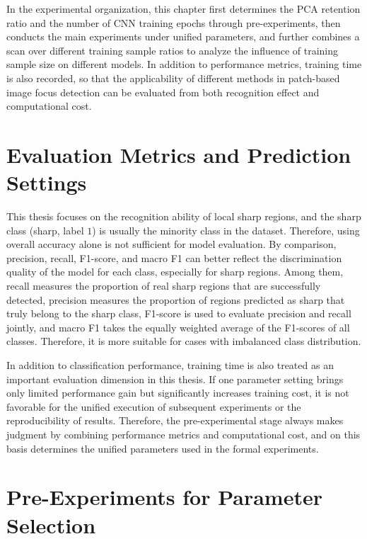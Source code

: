 \par In the experimental organization, this chapter first determines the PCA
retention ratio and the number of CNN training epochs through pre-experiments,
then conducts the main experiments under unified parameters, and further
combines a scan over different training sample ratios to analyze the influence
of training sample size on different models. In addition to performance
metrics, training time is also recorded, so that the applicability of
different methods in patch-based image focus detection can be evaluated from
both recognition effect and computational cost.

\section{Evaluation Metrics and Prediction Settings}
\par This thesis focuses on the recognition ability of local sharp regions, and
the sharp class (sharp, label $1$) is usually the minority class in the
dataset. Therefore, using overall accuracy alone is not sufficient for model
evaluation. By comparison, precision, recall, F1-score, and macro F1
\cite{schutze2008introduction} can better reflect the discrimination quality
of the model for each class, especially for sharp regions. Among them, recall
measures the proportion of real sharp regions that are successfully detected,
precision measures the proportion of regions predicted as sharp that truly
belong to the sharp class, F1-score is used to evaluate precision and recall
jointly, and macro F1 takes the equally weighted average of the F1-scores of
all classes. Therefore, it is more suitable for cases with imbalanced class
distribution.

\par In addition to classification performance, training time is also treated as
an important evaluation dimension in this thesis. If one parameter setting
brings only limited performance gain but significantly increases training cost,
it is not favorable for the unified execution of subsequent experiments or the
reproducibility of results. Therefore, the pre-experimental stage always makes
judgment by combining performance metrics and computational cost, and on this
basis determines the unified parameters used in the formal experiments.

\section{Pre-Experiments for Parameter Selection}
